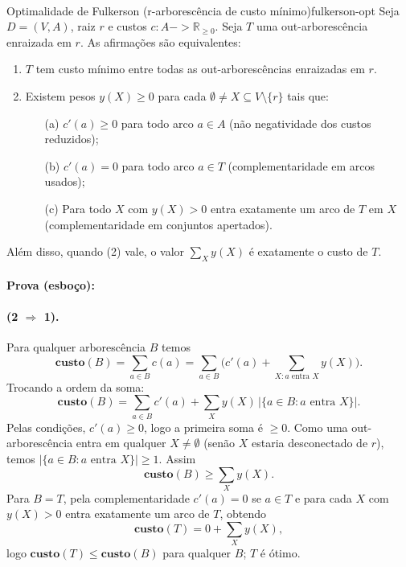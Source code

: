 \documentclass[12pt,a4paper]{article}
\def\emph#1{#1}%
\def\to{->}%
\begin{document}
\paragraph{}
\begin{teobox}{Optimalidade de Fulkerson (r-arborescência de custo mínimo)}{fulkerson-opt}
    Seja $D=(V,A)$, raiz $r$ e custos $c:A\to\mathbb{R}_{\ge 0}$. Seja $T$ uma out-arborescência enraizada em $r$. As afirmações são equivalentes:
    \begin{enumerate}\setlength{\itemsep}{4pt}
        \item $T$ tem custo mínimo entre todas as out-arborescências enraizadas em $r$.
        \item Existem pesos $y(X)\ge 0$ para cada $\emptyset\neq X\subseteq V\setminus\{r\}$ tais que:
              \begin{enumerate}\setlength{\itemsep}{2pt}
                  \item[(a)] $c'(a)\ge 0$ para todo arco $a\in A$ (não negatividade dos custos reduzidos);
                  \item[(b)] $c'(a)=0$ para todo arco $a\in T$ (complementaridade em arcos usados);
                  \item[(c)] Para todo $X$ com $y(X)>0$ entra \emph{exatamente um} arco de $T$ em $X$ (complementaridade em conjuntos apertados).
              \end{enumerate}
    \end{enumerate}
    Além disso, quando (2) vale, o valor $\sum_X y(X)$ é exatamente o custo de $T$.

    \paragraph{}
    \textbf{Prova (esboço):}

    \paragraph{(2 $\Rightarrow$ 1).} Para qualquer arborescência $B$ temos
    \[
        \textbf{custo}(B) = \sum_{a\in B} c(a) = \sum_{a\in B} \Big( c'(a) + \sum_{X: a\text{ entra }X} y(X) \Big).
    \]
    Trocando a ordem da soma:
    \[
        \textbf{custo}(B) = \sum_{a\in B} c'(a) + \sum_X y(X)\,\big| \{a\in B: a \text{ entra } X\}\big|.
    \]
    Pelas condições, $c'(a)\ge 0$, logo a primeira soma é $\ge 0$. Como uma out-arborescência entra em qualquer $X\neq\emptyset$ (senão $X$ estaria desconectado de $r$), temos $|\{a\in B: a \text{ entra } X\}|\ge 1$. Assim
    \[
        \textbf{custo}(B) \ge \sum_X y(X).
    \]
    Para $B=T$, pela complementaridade $c'(a)=0$ se $a\in T$ e para cada $X$ com $y(X)>0$ entra \emph{exatamente} um arco de $T$, obtendo
    \[
        \textbf{custo}(T) = 0 + \sum_X y(X),
    \]
    logo $\textbf{custo}(T) \le \textbf{custo}(B)$ para qualquer $B$; $T$ é ótimo.


\end{teobox}
\end{document}
